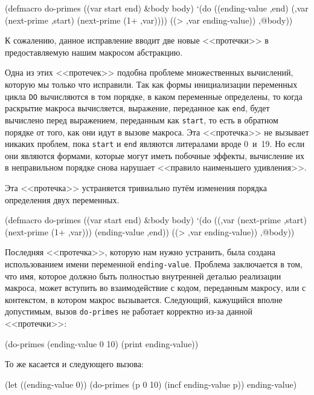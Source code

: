 \begin{myverb}
(defmacro do-primes ((var start end) &body body)
  `(do ((ending-value ,end)
        (,var (next-prime ,start) (next-prime (1+ ,var))))
       ((> ,var ending-value))
     ,@body))
\end{myverb}

К сожалению, данное исправление вводит две новые <<протечки>> в предоставляемую нашим
макросом абстракцию.

Одна из этих <<протечек>> подобна проблеме множественных вычислений, которую мы только что
исправили. Так как формы инициализации переменных цикла \lstinline{DO} вычисляются в том
порядке, в каком переменные определены, то когда раскрытие макроса вычисляется, выражение,
переданное как \lstinline{end}, будет вычислено перед выражением, переданным как
\lstinline{start}, то есть в обратном порядке от того, как они идут в вызове макроса. Эта
<<протечка>> не вызывает никаких проблем, пока \lstinline{start} и \lstinline{end}
являются литералами вроде 0~и~19. Но если они являются формами, которые могут иметь
побочные эффекты, вычисление их в неправильном порядке снова нарушает <<правило наименьшего
удивления>>.

Эта <<протечка>> устраняется тривиально путём изменения порядка определения двух переменных.

\begin{myverb}
(defmacro do-primes ((var start end) &body body)
  `(do ((,var (next-prime ,start) (next-prime (1+ ,var)))
        (ending-value ,end))
       ((> ,var ending-value))
     ,@body))
\end{myverb}

Последняя <<протечка>>, которую нам нужно устранить, была создана использованием имени
переменной \lstinline{ending-value}. Проблема заключается в том, что имя, которое должно быть
полностью внутренней деталью реализации макроса, может вступить во взаимодействие с кодом,
переданным макросу, или с контекстом, в котором макрос вызывается. Следующий, кажущийся
вполне допустимым, вызов \lstinline{do-primes} не работает корректно из-за данной <<протечки>>:

\begin{myverb}
(do-primes (ending-value 0 10)
  (print ending-value))
\end{myverb}

То же касается и следующего вызова:

\begin{myverb}
(let ((ending-value 0))
  (do-primes (p 0 10)
    (incf ending-value p))
  ending-value)
\end{myverb}

